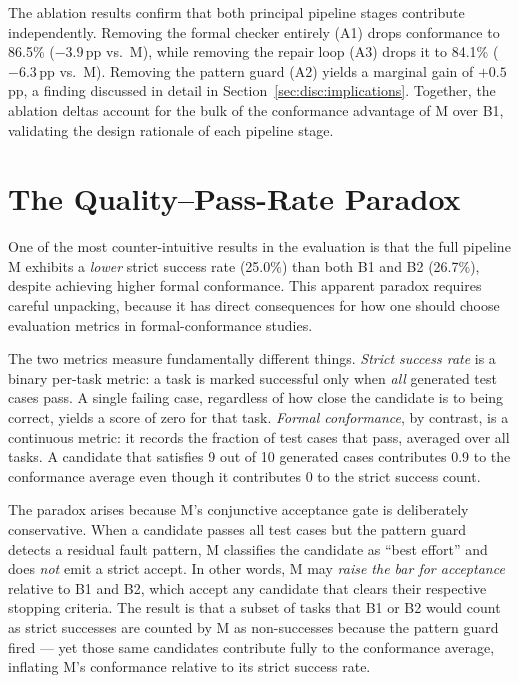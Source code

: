 The ablation results confirm that both principal pipeline stages contribute independently.
Removing the formal checker entirely (A1) drops conformance to 86.5\% ($-3.9$\,pp
vs.\ M), while removing the repair loop (A3) drops it to 84.1\% ($-6.3$\,pp vs.\ M).
Removing the pattern guard (A2) yields a marginal gain of $+0.5$\,pp, a finding discussed
in detail in Section~\ref{sec:disc:implications}.  Together, the ablation deltas account
for the bulk of the conformance advantage of M over B1, validating the design rationale of
each pipeline stage.

\section{The Quality–Pass-Rate Paradox}
\label{sec:disc:paradox}

One of the most counter-intuitive results in the evaluation is that the full pipeline M
exhibits a \emph{lower} strict success rate (25.0\%) than both B1 and B2 (26.7\%), despite
achieving higher formal conformance.  This apparent paradox requires careful unpacking,
because it has direct consequences for how one should choose evaluation metrics in
formal-conformance studies.

The two metrics measure fundamentally different things.  \emph{Strict success rate} is a
binary per-task metric: a task is marked successful only when \emph{all} generated test
cases pass.  A single failing case, regardless of how close the candidate is to being
correct, yields a score of zero for that task.  \emph{Formal conformance}, by contrast, is
a continuous metric: it records the fraction of test cases that pass, averaged over all
tasks.  A candidate that satisfies 9 out of 10 generated cases contributes 0.9 to the
conformance average even though it contributes 0 to the strict success count.

The paradox arises because M's conjunctive acceptance gate is deliberately conservative.
When a candidate passes all test cases but the pattern guard detects a residual fault
pattern, M classifies the candidate as ``best effort'' and does \emph{not} emit a strict
accept.  In other words, M may \emph{raise the bar for acceptance} relative to B1 and B2,
which accept any candidate that clears their respective stopping criteria.  The result is
that a subset of tasks that B1 or B2 would count as strict successes are counted by M as
non-successes because the pattern guard fired — yet those same candidates contribute fully
to the conformance average, inflating M's conformance relative to its strict success rate.


